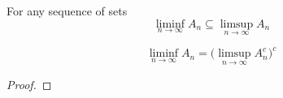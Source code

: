   \begin{lemma}[Monotonicity]
    \label{thm:monotonicity}
    For any sequence of sets 
    \begin{equation}
      \liminf_{n \to \infty} A_n \subseteq \limsup_{n \to \infty} A_n 
    \end{equation}
  \end{lemma}

  \begin{lemma}[Complements]
    \label{thm:complements}
    \begin{equation}
      \liminf_{n \to \infty} A_n = \bigg( \limsup_{n \to \infty} A_n^c  \bigg)^c
    \end{equation}
  \end{lemma}
  \begin{proof}
    
  \end{proof}

  \begin{definition}
    \label{def:limit-of-sets}
    
  \end{definition} 

